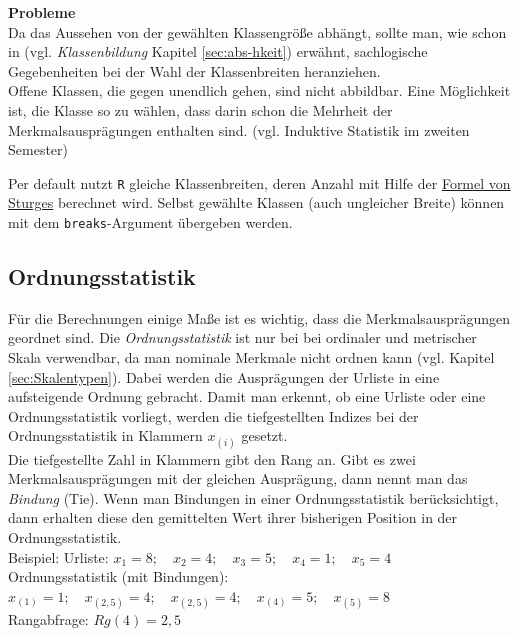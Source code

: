 \documentclass[a4paper]{article}
\newcommand\dangersign[1][2ex]{%
  \renewcommand\stacktype{L}%
  \scaleto{\stackon[1.3pt]{\color{red}$\triangle$}{\tiny !}}{#1}%
}
\begin{document}
\noindent \textbf{Probleme}\\
Da das Aussehen von der gewählten Klassengröße abhängt, sollte man, wie schon in (vgl. \textit{Klassenbildung} Kapitel \ref{sec:abs-hkeit})  erwähnt, sachlogische Gegebenheiten bei der Wahl der Klassenbreiten heranziehen.\\
Offene Klassen, die gegen unendlich gehen, sind nicht abbildbar. Eine Möglichkeit ist, die Klasse so zu wählen, dass darin schon die Mehrheit der Merkmalsausprägungen enthalten sind. (vgl. Induktive Statistik im zweiten Semester)\\

\noindent {}

\noindent \dangersign[3ex] Per default nutzt \texttt{R} gleiche Klassenbreiten, deren Anzahl mit Hilfe der \href{https://en.wikipedia.org/wiki/Histogram#Sturges'_formula}{Formel von Sturges} berechnet wird. Selbst gewählte Klassen (auch ungleicher Breite) können mit dem \texttt{breaks}-Argument übergeben werden.

\subsection{Ordnungsstatistik}

Für die Berechnungen einige Maße ist es wichtig, dass die Merkmalsausprägungen geordnet sind. Die \textit{Ordnungsstatistik} ist nur bei bei ordinaler und metrischer Skala verwendbar, da man nominale Merkmale nicht ordnen kann (vgl. Kapitel \ref{sec:Skalentypen}). Dabei werden die Ausprägungen der Urliste in eine aufsteigende Ordnung gebracht. Damit man erkennt, ob eine Urliste oder eine Ordnungsstatistik vorliegt, werden die tiefgestellten Indizes bei der Ordnungsstatistik in Klammern $x_{(i)}$ gesetzt.\\
Die tiefgestellte Zahl in Klammern gibt den Rang an. Gibt es zwei Merkmalsausprägungen mit der gleichen Ausprägung, dann nennt man das \textit{Bindung} (Tie). Wenn man Bindungen in einer Ordnungsstatistik berücksichtigt, dann erhalten diese den gemittelten Wert ihrer bisherigen Position in der Ordnungsstatistik.\\
Beispiel: Urliste: $x_1=8;\quad x_2=4;\quad x_3=5;\quad x_4=1;\quad x_5=4$\\
Ordnungsstatistik (mit Bindungen): $x_{(1)}=1;\quad x_{(2,5)}=4;\quad x_{(2,5)}=4;\quad x_{(4)}=5;\quad x_{(5)}=8$\\
Rangabfrage: $Rg(4)=2,5$\\
\end{document}

